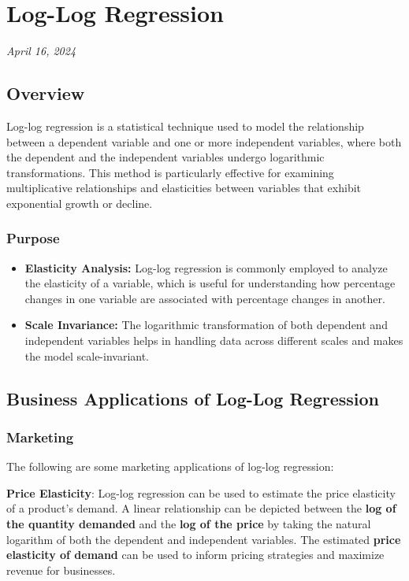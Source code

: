 \documentclass[
  letterpaper,
  DIV=11,
  numbers=noendperiod]{scrreport}
\author{}
\date{}
\providecommand{\tightlist}{%
  \setlength{\itemsep}{0pt}\setlength{\parskip}{0pt}}\usepackage{longtable,booktabs,array}
\begin{document}
\chapter{Log-Log Regression}\label{log-log-regression}

\emph{April 16, 2024}

\section{Overview}\label{overview}

Log-log regression is a statistical technique used to model the
relationship between a dependent variable and one or more independent
variables, where both the dependent and the independent variables
undergo logarithmic transformations. This method is particularly
effective for examining multiplicative relationships and elasticities
between variables that exhibit exponential growth or decline.

\subsection{Purpose}\label{purpose}

\begin{itemize}
\tightlist
\item
  \textbf{Elasticity Analysis:} Log-log regression is commonly employed
  to analyze the elasticity of a variable, which is useful for
  understanding how percentage changes in one variable are associated
  with percentage changes in another.
\item
  \textbf{Scale Invariance:} The logarithmic transformation of both
  dependent and independent variables helps in handling data across
  different scales and makes the model scale-invariant.
\end{itemize}

\section{Business Applications of Log-Log
Regression}\label{business-applications-of-log-log-regression}

\subsection{Marketing}\label{marketing}

The following are some marketing applications of log-log regression:

\textbf{Price Elasticity}: Log-log regression can be used to estimate
the price elasticity of a product's demand. A linear relationship can be
depicted between the \textbf{log of the quantity demanded} and the
\textbf{log of the price} by taking the natural logarithm of both the
dependent and independent variables. The estimated \textbf{price
elasticity of demand} can be used to inform pricing strategies and
maximize revenue for businesses.
\end{document}
